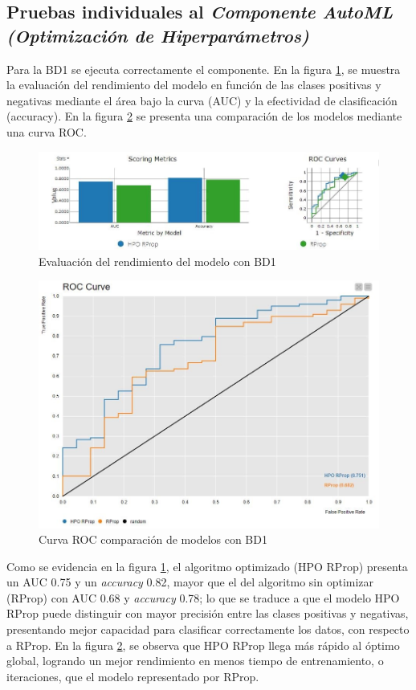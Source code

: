 \subsection{Pruebas individuales al \textit{Componente AutoML (Optimización de Hiperparámetros)}}
Para la BD1 se ejecuta correctamente el componente. En la figura \ref{fig:eval-rend-modelo-bd1-hpo}, se muestra la evaluación del rendimiento del modelo en función de las clases positivas y negativas mediante el área bajo la curva (AUC) y la efectividad de clasificación (accuracy). En la figura \ref{fig:roc-bd1-hpo} se presenta una comparación de los modelos mediante una curva ROC.

\begin{figure}[H]
	\centering
	\includegraphics[width=0.7\linewidth]{"figuras/capi 3/pruebas-ray/eval-rend-modelo-bd1-hpo"}
	\caption{Evaluación del rendimiento del modelo con BD1}
	\label{fig:eval-rend-modelo-bd1-hpo}
\end{figure}

\begin{figure}[H]
	\centering
	\includegraphics[width=0.55\linewidth]{"figuras/capi 3/pruebas-ray/roc-bd1-hpo"}
	\caption{Curva ROC comparación de modelos con BD1}
	\label{fig:roc-bd1-hpo}
\end{figure}

Como se evidencia en la figura \ref{fig:eval-rend-modelo-bd1-hpo}, el algoritmo optimizado (HPO RProp) presenta un AUC 0.75 y un \textit{accuracy} 0.82, mayor que el del algoritmo sin optimizar (RProp) con AUC 0.68 y \textit{accuracy} 0.78; lo que se traduce a que el modelo HPO RProp puede distinguir con mayor precisión entre las clases positivas y negativas, presentando mejor capacidad para clasificar correctamente los datos, con respecto a RProp. En la figura \ref{fig:roc-bd1-hpo}, se observa que HPO RProp llega más rápido al óptimo global, logrando un mejor rendimiento en menos tiempo de entrenamiento, o iteraciones, que el modelo representado por RProp. \\

